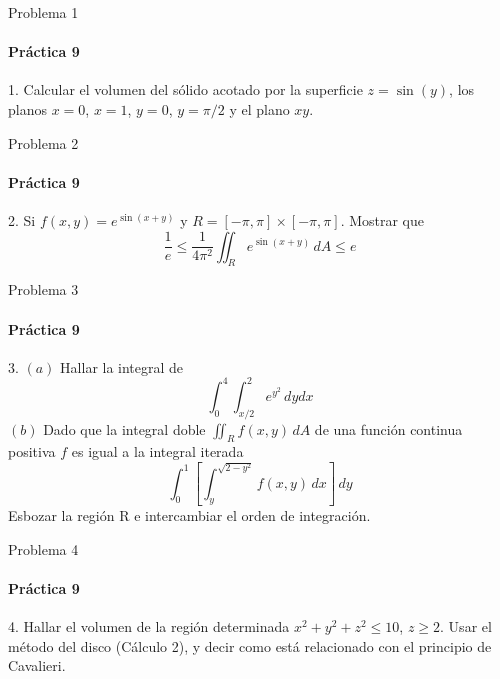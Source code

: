\documentclass{plantillaPPT}
\begin{document}
\primeraDiapo
\begin{frame}{Problema 1}
\framesubtitle{Práctica 9}
1. Calcular el volumen del sólido acotado por la superficie $z = \sin(y)$, los planos $x=0$, $x=1$, $y=0$, $y=\pi/2$ y el plano $xy$.
\end{frame}
\begin{frame}{Problema 2}
\framesubtitle{Práctica 9}
2. Si $f(x,y)=e^{\sin(x+y)}$ y $R=[-\pi,\pi]\times[-\pi,\pi]$. Mostrar que
\begin{equation*}
    \frac{1}{e}\leq\frac{1}{4\pi^2}\iint_R e^{\sin(x+y)}\,dA \leq e
\end{equation*}
\end{frame}
\begin{frame}{Problema 3}
\framesubtitle{Práctica 9}
3. $(a)$ Hallar la integral de 
\begin{equation*}
    \int_0^4\int_{x/2}^2e^{y^2}\,dydx
\end{equation*}
$(b)$ Dado que la integral doble $\iint_R f(x,y)\,dA$ de una función continua positiva $f$ es igual a la integral iterada
\begin{equation*}
    \int_0^1 \left[\int_y^{\sqrt{2-y^2}}f(x,y)\,dx\right]\,dy
\end{equation*}
Esbozar la región R e intercambiar el orden de integración.
\end{frame}
\begin{frame}{Problema 4}
\framesubtitle{Práctica 9}
4. Hallar el volumen de la región determinada $x^2+y^2+z^2\leq10$, $z\geq2$.
Usar el método del disco (Cálculo 2), y decir como está relacionado con el principio de Cavalieri.
\end{frame}
\end{document}
